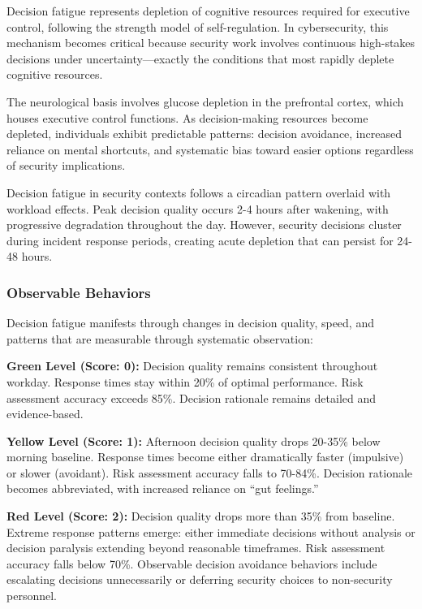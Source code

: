 \documentclass[11pt,a4paper]{article}
\begin{document}
Decision fatigue represents depletion of cognitive resources required for executive control, following the strength model of self-regulation\cite{baumeister1998}. In cybersecurity, this mechanism becomes critical because security work involves continuous high-stakes decisions under uncertainty---exactly the conditions that most rapidly deplete cognitive resources.

The neurological basis involves glucose depletion in the prefrontal cortex, which houses executive control functions\cite{gailliot2007}. As decision-making resources become depleted, individuals exhibit predictable patterns: decision avoidance, increased reliance on mental shortcuts, and systematic bias toward easier options regardless of security implications.

Decision fatigue in security contexts follows a circadian pattern overlaid with workload effects. Peak decision quality occurs 2-4 hours after wakening, with progressive degradation throughout the day. However, security decisions cluster during incident response periods, creating acute depletion that can persist for 24-48 hours.

\subsubsection{Observable Behaviors}

Decision fatigue manifests through changes in decision quality, speed, and patterns that are measurable through systematic observation:

\textbf{Green Level (Score: 0):} Decision quality remains consistent throughout workday. Response times stay within 20\% of optimal performance. Risk assessment accuracy exceeds 85\%. Decision rationale remains detailed and evidence-based.

\textbf{Yellow Level (Score: 1):} Afternoon decision quality drops 20-35\% below morning baseline. Response times become either dramatically faster (impulsive) or slower (avoidant). Risk assessment accuracy falls to 70-84\%. Decision rationale becomes abbreviated, with increased reliance on ``gut feelings.''

\textbf{Red Level (Score: 2):} Decision quality drops more than 35\% from baseline. Extreme response patterns emerge: either immediate decisions without analysis or decision paralysis extending beyond reasonable timeframes. Risk assessment accuracy falls below 70\%. Observable decision avoidance behaviors include escalating decisions unnecessarily or deferring security choices to non-security personnel.
\end{document}
